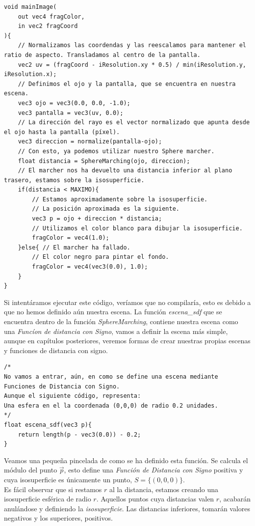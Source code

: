 \begin{lstlisting}
void mainImage(
    out vec4 fragColor, 
    in vec2 fragCoord
){
    // Normalizamos las coordendas y las reescalamos para mantener el ratio de aspecto. Transladamos al centro de la pantalla.
    vec2 uv = (fragCoord - iResolution.xy * 0.5) / min(iResolution.y, iResolution.x);
    // Definimos el ojo y la pantalla, que se encuentra en nuestra escena.
    vec3 ojo = vec3(0.0, 0.0, -1.0);
    vec3 pantalla = vec3(uv, 0.0);
    // La dirección del rayo es el vector normalizado que apunta desde el ojo hasta la pantalla (píxel).
    vec3 direccion = normalize(pantalla-ojo);
    // Con esto, ya podemos utilizar nuestro Sphere marcher.
    float distancia = SphereMarching(ojo, direccion);
    // El marcher nos ha devuelto una distancia inferior al plano trasero, estamos sobre la isosuperficie.
    if(distancia < MAXIMO){
        // Estamos aproximadamente sobre la isosuperficie.
        // La posición aproximada es la siguiente.
        vec3 p = ojo + direccion * distancia;
        // Utilizamos el color blanco para dibujar la isosuperficie.
        fragColor = vec4(1.0);
    }else{ // El marcher ha fallado.
        // El color negro para pintar el fondo.
        fragColor = vec4(vec3(0.0), 1.0);
    }
}
\end{lstlisting}
\newpage
Si intentáramos ejecutar este código, veríamos que no compilaría, esto es debido a que no hemos definido aún nuestra escena. La función \textit{escena\_sdf} que se encuentra dentro de la función \textit{SphereMarching}, contiene nuestra escena como una \textit{Funcíon de distancia con Signo}, vamos a definir la escena más simple, aunque en capítulos posteriores, veremos formas de crear nuestras propias escenas y funciones de distancia con signo.
\begin{lstlisting}
/* 
No vamos a entrar, aún, en como se define una escena mediante Funciones de Distancia con Signo.
Aunque el siguiente código, representa:
Una esfera en el la coordenada (0,0,0) de radio 0.2 unidades.
*/
float escena_sdf(vec3 p){
    return length(p - vec3(0.0)) - 0.2;
}
\end{lstlisting}
Veamos una pequeña pincelada de como se ha definido esta función. Se calcula el módulo del punto \(\Vec{p}\), esto define una \textit{Función de Distancia con Signo} positiva y cuya isosuperficie es únicamente un punto, \(S=\{(0,0,0)\}\).\\Es fácil observar que si restamos \(r\) al la distancia, estamos creando una isosuperficie esférica de radio \(r\). Aquellos puntos cuya distancias valen \(r\), acabarán anulándose y definiendo la \textit{isosuperficie}. Las distancias inferiores, tomarán valores negativos y los superiores, positivos.
